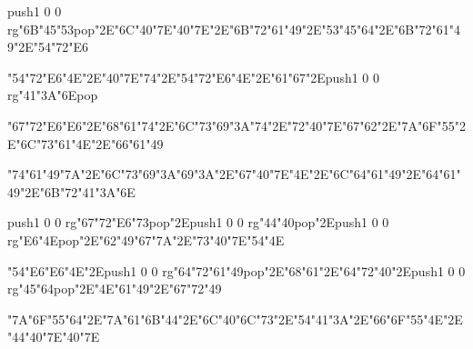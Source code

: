 \centerline{\pdfcolorstack\match push{1 0 0 rg}\ipa\char"6B\ipa\char"45\ipa\char"53\pdfcolorstack\match pop{}\ipa\char"2E\ipa\char"6C\ipa\char"40\ipa\char"7E\ipa\char"40\ipa\char"7E\ipa\char"2E\ipa\char"6B\ipa\char"72\ipa\char"61\ipa\char"49\ipa\char"2E\ipa\char"53\ipa\char"45\ipa\char"64\ipa\char"2E\ipa\char"6B\ipa\char"72\ipa\char"61\ipa\char"49\ipa\char"2E\ipa\char"54\ipa\char"72\ipa\char"E6}
\vfill\eject
\null\vfill
\centerline{\ipa\char"54\ipa\char"72\ipa\char"E6\ipa\char"4E\ipa\char"2E\ipa\char"40\ipa\char"7E\ipa\char"74\ipa\char"2E\ipa\char"54\ipa\char"72\ipa\char"E6\ipa\char"4E\ipa\char"2E\ipa\char"61\ipa\char"67\ipa\char"2E\pdfcolorstack\match push{1 0 0 rg}\ipa\char"41\ipa\char"3A\ipa\char"6E\pdfcolorstack\match pop{}}\bigskip
\centerline{\ipa\char"67\ipa\char"72\ipa\char"E6\ipa\char"E6\ipa\char"2E\ipa\char"68\ipa\char"61\ipa\char"74\ipa\char"2E\ipa\char"6C\ipa\char"73\ipa\char"69\ipa\char"3A\ipa\char"74\ipa\char"2E\ipa\char"72\ipa\char"40\ipa\char"7E\ipa\char"67\ipa\char"62\ipa\char"2E\ipa\char"7A\ipa\char"6F\ipa\char"55\ipa\char"2E\ipa\char"6C\ipa\char"73\ipa\char"61\ipa\char"4E\ipa\char"2E\ipa\char"66\ipa\char"61\ipa\char"49}\bigskip
\centerline{\ipa\char"74\ipa\char"61\ipa\char"49\ipa\char"7A\ipa\char"2E\ipa\char"6C\ipa\char"73\ipa\char"69\ipa\char"3A\ipa\char"69\ipa\char"3A\ipa\char"2E\ipa\char"67\ipa\char"40\ipa\char"7E\ipa\char"4E\ipa\char"2E\ipa\char"6C\ipa\char"64\ipa\char"61\ipa\char"49\ipa\char"2E\ipa\char"64\ipa\char"61\ipa\char"49\ipa\char"2E\ipa\char"6B\ipa\char"72\ipa\char"41\ipa\char"3A\ipa\char"6E}
\vfill\eject
\null\vfill
\centerline{\pdfcolorstack\match push{1 0 0 rg}\ipa\char"67\ipa\char"72\ipa\char"E6\ipa\char"73\pdfcolorstack\match pop{}\ipa\char"2E\pdfcolorstack\match push{1 0 0 rg}\ipa\char"44\ipa\char"40\pdfcolorstack\match pop{}\ipa\char"2E\pdfcolorstack\match push{1 0 0 rg}\ipa\char"E6\ipa\char"4E\pdfcolorstack\match pop{}\ipa\char"2E\ipa\char"62\ipa\char"49\ipa\char"67\ipa\char"7A\ipa\char"2E\ipa\char"73\ipa\char"40\ipa\char"7E\ipa\char"54\ipa\char"4E}\bigskip
\centerline{\ipa\char"54\ipa\char"E6\ipa\char"E6\ipa\char"4E\ipa\char"2E\pdfcolorstack\match push{1 0 0 rg}\ipa\char"64\ipa\char"72\ipa\char"61\ipa\char"49\pdfcolorstack\match pop{}\ipa\char"2E\ipa\char"68\ipa\char"61\ipa\char"2E\ipa\char"64\ipa\char"72\ipa\char"40\ipa\char"2E\pdfcolorstack\match push{1 0 0 rg}\ipa\char"45\ipa\char"64\pdfcolorstack\match pop{}\ipa\char"2E\ipa\char"4E\ipa\char"61\ipa\char"49\ipa\char"2E\ipa\char"67\ipa\char"72\ipa\char"49}\bigskip
\centerline{\ipa\char"7A\ipa\char"6F\ipa\char"55\ipa\char"64\ipa\char"2E\ipa\char"7A\ipa\char"61\ipa\char"6B\ipa\char"44\ipa\char"2E\ipa\char"6C\ipa\char"40\ipa\char"6C\ipa\char"73\ipa\char"2E\ipa\char"54\ipa\char"41\ipa\char"3A\ipa\char"2E\ipa\char"66\ipa\char"6F\ipa\char"55\ipa\char"4E\ipa\char"2E\ipa\char"44\ipa\char"40\ipa\char"7E\ipa\char"40\ipa\char"7E}
